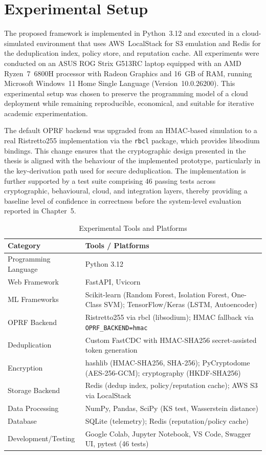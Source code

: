 \documentclass[12pt,a4paper,oneside]{report}
\begin{document}
\section{Experimental Setup}

The proposed framework is implemented in Python~3.12 and executed in a cloud-simulated environment that uses AWS~LocalStack for S3 emulation and Redis for the deduplication index, policy store, and reputation cache. All experiments were conducted on an ASUS ROG Strix G513RC laptop equipped with an AMD Ryzen~7~6800H processor with Radeon Graphics and 16~GB of RAM, running Microsoft Windows~11 Home Single Language (Version~10.0.26200). This experimental setup was chosen to preserve the programming model of a cloud deployment while remaining reproducible, economical, and suitable for iterative academic experimentation.

The default OPRF backend was upgraded from an HMAC-based simulation to a real Ristretto255 implementation via the \texttt{rbcl} package, which provides libsodium bindings. This change ensures that the cryptographic design presented in the thesis is aligned with the behaviour of the implemented prototype, particularly in the key-derivation path used for secure deduplication. The implementation is further supported by a test suite comprising 46 passing tests across cryptographic, behavioural, cloud, and integration layers, thereby providing a baseline level of confidence in correctness before the system-level evaluation reported in Chapter~5.

\begin{table}[H]
\centering
\caption{Experimental Tools and Platforms}
\label{tab:tools}
\begin{tabularx}{\textwidth}{L{4cm}X}
\toprule
\textbf{Category} & \textbf{Tools / Platforms} \\
\midrule
Programming Language & Python 3.12 \\
Web Framework        & FastAPI, Uvicorn \\
ML Frameworks        & Scikit-learn (Random Forest, Isolation Forest, One-Class SVM); TensorFlow/Keras (LSTM, Autoencoder) \\
OPRF Backend         & Ristretto255 via rbcl (libsodium); HMAC fallback via \texttt{OPRF\_BACKEND=hmac} \\
Deduplication        & Custom FastCDC with HMAC-SHA256 secret-assisted token generation \\
Encryption           & hashlib (HMAC-SHA256, SHA-256); PyCryptodome (AES-256-GCM); cryptography (HKDF-SHA256) \\
Storage Backend      & Redis (dedup index, policy/reputation cache); AWS S3 via LocalStack \\
Data Processing      & NumPy, Pandas, SciPy (KS test, Wasserstein distance) \\
Database             & SQLite (telemetry); Redis (reputation/policy cache) \\
Development/Testing  & Google Colab, Jupyter Notebook, VS Code, Swagger UI, pytest (46 tests) \\
\bottomrule
\end{tabularx}
\end{table}
\end{document}
